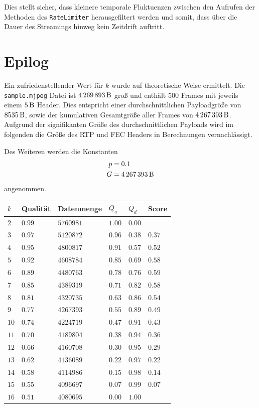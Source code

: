 \documentclass[a4paper,12pt]{article}
\begin{document}
Dies stellt sicher, dass kleinere temporale Fluktuenzen zwischen den Aufrufen der Methoden des \texttt{RateLimiter} herausgefiltert werden und somit, dass über die Dauer des Streamings hinweg kein Zeitdrift auftritt.

\clearpage
\section{Epilog}

Ein zufriedenstellender Wert für $k$ wurde auf theoretische Weise ermittelt.
Die \texttt{sample.mjpeg} Datei ist $\SI{4269893}{\byte}$ groß und enthält $500$ Frames mit jeweils einem $\SI{5}{\byte}$ Header.
Dies entspricht einer durchschnittlichen Payloadgröße von $\SI{8535}{\byte}$, sowie der kumulativen Gesamtgröße aller Frames von $\SI{4267393}{\byte}$.
Aufgrund der signifikanten Größe des durchschnittlichen Payloads wird im folgenden die Größe des RTP und FEC Headers in Berechnungen vernachlässigt.

Des Weiteren werden die Konstanten
\begin{align*}
p &= 0.1 \\
G &= \SI{4267393}{\byte}
\end{align*}
angenommen.

\begin{tabu} to \linewidth { l | X | X | X | X | X }
	$k$  & Qualität & Datenmenge & $Q_q$  & $Q_d$  & Score \\ \hline
	$2$  & $0.99$   & $5760981$  & $1.00$ & $0.00$ & \\
	$3$  & $0.97$   & $5120872$  & $0.96$ & $0.38$ & $0.37$ \\
	$4$  & $0.95$   & $4800817$  & $0.91$ & $0.57$ & $0.52$ \\
	$5$  & $0.92$   & $4608784$  & $0.85$ & $0.69$ & $0.58$ \\
	$6$  & $0.89$   & $4480763$  & $0.78$ & $0.76$ & $0.59$ \\
	$7$  & $0.85$   & $4389319$  & $0.71$ & $0.82$ & $0.58$ \\
	$8$  & $0.81$   & $4320735$  & $0.63$ & $0.86$ & $0.54$ \\
	$9$  & $0.77$   & $4267393$  & $0.55$ & $0.89$ & $0.49$ \\
	$10$ & $0.74$   & $4224719$  & $0.47$ & $0.91$ & $0.43$ \\
	$11$ & $0.70$   & $4189804$  & $0.38$ & $0.94$ & $0.36$ \\
	$12$ & $0.66$   & $4160708$  & $0.30$ & $0.95$ & $0.29$ \\
	$13$ & $0.62$   & $4136089$  & $0.22$ & $0.97$ & $0.22$ \\
	$14$ & $0.58$   & $4114986$  & $0.15$ & $0.98$ & $0.14$ \\
	$15$ & $0.55$   & $4096697$  & $0.07$ & $0.99$ & $0.07$ \\
	$16$ & $0.51$   & $4080695$  & $0.00$ & $1.00$ & \\
\end{tabu}
\end{document}

